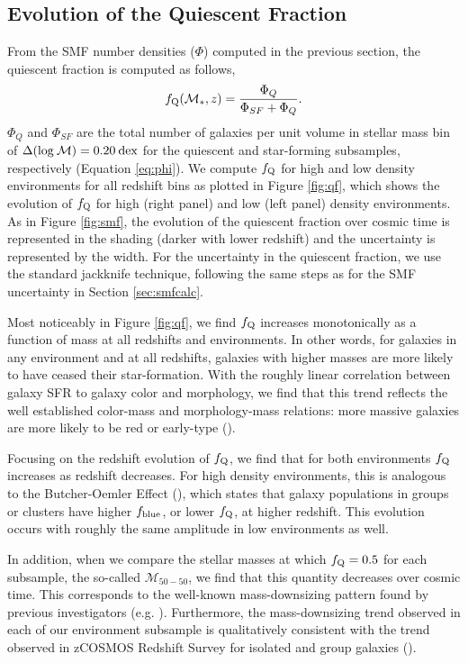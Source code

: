 \documentclass{emulateapj}
\begin{document}
\subsection{Evolution of the Quiescent Fraction} \label{sec:qfevol}
From the SMF number densities ($\Phi$) computed in the previous section, the quiescent fraction is computed as follows, 
\begin{equation}
f_{\rm{Q}} ( \mathcal{M}_{*}, z)= \frac{\Phi_{Q}}{\Phi_{SF}+\Phi_{Q}}.
\end{equation}
$\Phi_{Q}$ and $\Phi_{SF}$ are the total number of galaxies per unit
volume in stellar mass bin of $\Delta(\rm{log} \: \mathcal{M}) = 0.20
\: \mathrm{dex}$ for the quiescent and star-forming subsamples,
respectively (Equation \ref{eq:phi}). We compute $f_{\rm{Q}}$ for high
and low density environments for all redshift bins as plotted in
Figure \ref{fig:qf}, which shows the evolution of $f_{\rm{Q}}$ for
high (right panel) and low (left panel) density environments. As in
Figure \ref{fig:smf}, the evolution of the quiescent fraction over
cosmic time is represented in the shading (darker with lower redshift)
and the uncertainty is represented by the width. For the uncertainty
in the quiescent fraction, we use the standard jackknife technique,
following the same steps as for the SMF uncertainty in Section \ref{sec:smfcalc}. 

Most noticeably in Figure \ref{fig:qf}, we find $f_{\rm{Q}}$ increases
monotonically as a function of mass at all redshifts and
environments. In other words, for galaxies in any environment and at all redshifts, galaxies with higher
masses are more likely to have ceased their star-formation. With the roughly linear correlation between galaxy SFR to galaxy color and morphology, we find that this trend reflects the well established color-mass and morphology-mass relations: more massive galaxies are more likely to be red or early-type (\citealt{blanton09a}). 

Focusing on the redshift evolution of $f_{\rm{Q}}$, we find that for
both environments $f_{\rm{Q}}$ increases as redshift decreases. For
high density environments, this is analogous to the Butcher-Oemler
Effect (\citealt{Butcher:1984aa}), which states that galaxy
populations in groups or clusters have higher $f_{\rm{blue}}$, or
lower $f_{\rm{Q}}$, at higher redshift. This evolution occurs with
roughly the same amplitude in low environments as well.

In addition, when we compare the stellar masses at which $f_{\rm{Q}} =
0.5$ for each subsample, the so-called $\mathcal{M}_{50-50}$, we find
that this quantity decreases over cosmic time. This corresponds to the
well-known mass-downsizing pattern found by previous investigators
(e.g. \citealt{bundy06a}). Furthermore, the mass-downsizing trend
observed in each of our environment subsample is qualitatively
consistent with the trend observed in zCOSMOS Redshift Survey for
isolated and group galaxies (\citealt{Iovino:2010aa}).
\end{document}

